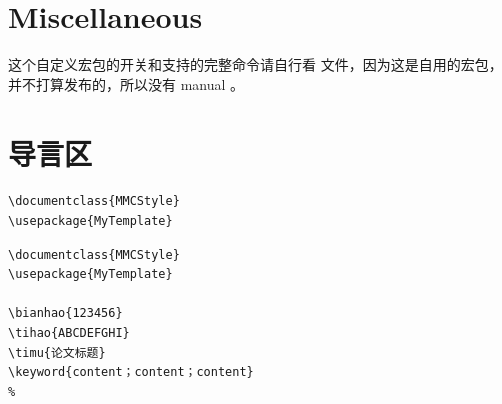 \documentclass{MMCStyle}
\begin{document}
\appendix

\section{Miscellaneous}

 这个自定义宏包的开关和支持的完整命令请自行看  文件，因为这是自用的宏包，并不打算发布的，所以没有 manual 。

\section{导言区}

\begin{solution}
\begin{verbatim}
\documentclass{MMCStyle}
\usepackage{MyTemplate}
\end{verbatim}
\end{solution}

\begin{solution}[完整导言区：]
\begin{verbatim}
\documentclass{MMCStyle}
\usepackage{MyTemplate}

\bianhao{123456}
\tihao{ABCDEFGHI}
\timu{论文标题}
\keyword{content；content；content}
% 

\end{verbatim}
\end{solution}
\end{document}
